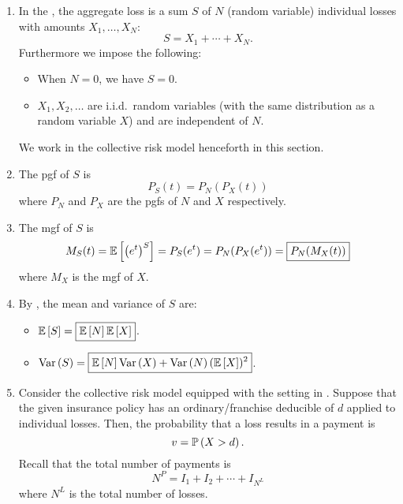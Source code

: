 \begin{enumerate}
\item In the , the aggregate loss is a sum
\(S\) of \(N\) (random variable) individual losses with amounts
\(X_1,\dotsc,X_N\):
\[
S=X_1+\dotsb+X_N.
\]
Furthermore we impose the following:
\begin{itemize}
\item When \(N=0\), we have \(S=0\).
\item \(X_1,X_2,\dotsc\) are i.i.d.\ random variables (with the same
distribution as a random variable \(X\)) and are independent of \(N\).
\end{itemize}
We work in the collective risk model henceforth in this section.
\item \label{it:collective-risk-s-pgf}
The pgf of \(S\) is
\[
P_S(t)=\boxed{P_N(P_X(t))}
\]
where \(P_N\) and \(P_X\) are the pgfs of \(N\) and \(X\) respectively.

\item \label{it:collective-risk-s-mgf}
The mgf of \(S\) is
\[
M_S(t)=\mathbb{E}\left[\qty(e^t)^S\right]=P_S(e^t)
=P_N(P_X(e^t))=\boxed{P_N(M_X(t))}
\]
where \(M_X\) is the mgf of \(X\).

\item \label{it:collective-risk-s-mean-var}
By , the mean and variance of \(S\) are:
\begin{itemize}
\item \(\mathbb{E}\left[S\right]=\boxed{\mathbb{E}\left[N\right]\mathbb{E}\left[X\right]}\).
\item \(\operatorname{Var}\left(S\right)=\boxed{\mathbb{E}\left[N\right]\operatorname{Var}\left(X\right)+\operatorname{Var}\left(N\right)(\mathbb{E}\left[X\right])^2}\).
\end{itemize}

\item Consider the collective risk model equipped with the setting in
. Suppose that the given insurance policy has an
ordinary/franchise deducible of \(d\) applied to individual losses. Then, the
probability that a loss results in a payment is
\[
v=\mathbb{P}\left(X>d\right).
\]
Recall that the total number of payments is
\[
N^P=I_1+I_2+\dotsb+I_{N^L}
\]
where \(N^L\) is the total number of losses.


\end{enumerate}
